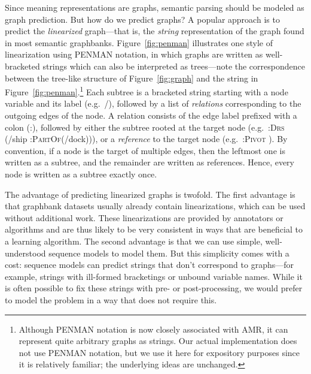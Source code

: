 \documentclass[11pt,a4paper]{article}
\theoremstyle{plain}
\begin{document}
Since meaning representations are graphs, semantic parsing should be
modeled as graph prediction. But how do we predict graphs? A popular
approach is to predict the \emph{linearized} graph---that is, the
\emph{string} representation of the graph found in most semantic
graphbanks. Figure~\ref{fig:penman} illustrates one style of
linearization using PENMAN notation, in which graphs are written as
well-bracketed strings which can also be interpreted as trees---note
the correspondence between the tree-like structure of
Figure~\ref{fig:graph} and the string in
Figure~\ref{fig:penman}.\footnote{Although PENMAN notation is now
  closely associated with AMR, it can represent quite arbitrary graphs
  as strings. Our actual implementation does not use PENMAN notation,
  but we use it here for expository purposes since it is relatively
  familiar; the underlying ideas are unchanged.} Each subtree is a
bracketed string starting with a node variable and its label
(e.g.~/), followed by a list of \emph{relations}
corresponding to the outgoing edges of the node. A relation consists
of the edge label prefixed with a colon (:), followed by either the
subtree rooted at the target node (e.g.~:\textsc{Drs} (/ship
:\textsc{PartOf}(/dock))), or a \emph{reference} to the
target node (e.g.~:\textsc{Pivot} ). By convention, if a node is
the target of multiple edges, then the leftmost one is written as a
subtree, and the remainder are written as references. Hence, every node
is written as a subtree exactly once.

The advantage of predicting linearized graphs is twofold. The first advantage is that graphbank datasets usually already contain linearizations, which can be used without additional work. These linearizations are provided by annotators or algorithms and are thus likely to be very consistent in ways that are beneficial to a learning algorithm. The second advantage is that we can use simple, well-understood sequence models \citep{gu2016incorporating,jia2016data,van2018exploring} to model them. But this simplicity comes with a cost: sequence models can predict strings that don't correspond to graphs---for example, strings with ill-formed bracketings or unbound variable names. While it is often possible to fix these strings with pre- or post-processing, we would prefer to model the problem in a way that does not require this.
\end{document}
